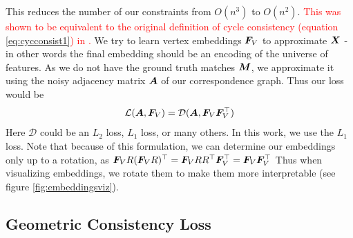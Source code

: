 \documentclass{article} %
\begin{document}
This reduces the number of our constraints from $O(n^3)$ to $O(n^2)$.
\textcolor{red}{This was shown to be equivalent to the original definition of cycle consistency (equation \ref{eq:cycconsist1}) in \cite{huang2013consistent}.}
We try to learn vertex embeddings ${\bm{F}}_V$ to approximate ${\bm{X}}$ - in other words the final embedding should be an encoding of the universe of features.
As we do not have the ground truth matches ${\bm{M}}$, we approximate it using the noisy adjacency matrix ${\bm{A}}$ of our correspondence graph. Thus our loss would be 
\begin{equation}
\mathcal{L}({\bm{A}}, {\bm{F}}_V) = \mathcal{D}({\bm{A}}, {\bm{F}}_V {\bm{F}}_V^\top)
\end{equation}
Here $\mathcal{D}$ could be an $L_2$ loss, $L_1$ loss, or many others. In this work, we use the $L_1$ loss. 
Note that because of this formulation, we can determine our embeddings only up to a rotation, as
$ {\bm{F}}_V R({\bm{F}}_V R)^\top
= {\bm{F}}_V RR^\top {\bm{F}}_V^\top
= {\bm{F}}_V{\bm{F}}_V^\top
\label{eq:rotinvar} $
Thus when visualizing embeddings, we rotate them to make them more interpretable (see figure \ref{fig:embeddingsviz}).

\subsection{Geometric Consistency Loss}
\end{document}
